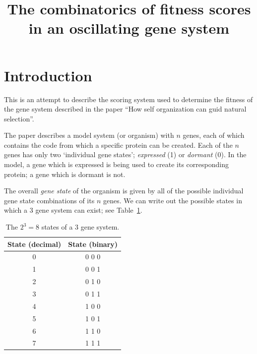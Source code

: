 \documentclass[11pt, a4paper]{article}
\title {
  The combinatorics of fitness scores in an oscillating gene system
}
\date{} %
\author{\Authors}
\begin{document}
\setlength{\droptitle}{-1.8cm} %
\maketitle

\vspace{-1.8cm} %

\section{Introduction}

This is an attempt to describe the scoring system used to determine
the fitness of the gene system described in the paper ``How self
organization can guid natural selection''.

The paper describes a model system (or organism) with $n$ genes, each
of which contains the code from which a specific protein can be
created. Each of the $n$ genes has only two `individual gene
states'; \emph{expressed} (1) or \emph{dormant} (0). In the model, a
gene which is expressed is being used to create its corresponding
protein; a gene which is dormant is not.

The overall \emph{gene state} of the organism is given by all of the
possible individual gene state combinations of its $n$ genes. We can
write out the possible states in which a 3 gene system can exist; see
Table~\ref{tab:states}.

\begin{table}[h!]
  \begin{center}
    \caption{The $2^3 = 8$ states of a 3 gene system.}
    \label{tab:states}
    \begin{tabular}{c|c}
      \textbf{State (decimal)} & \textbf{State (binary)} \\
      \hline
      0 & 0 0 0\\
      1 & 0 0 1\\
      2 & 0 1 0\\
      3 & 0 1 1\\
      4 & 1 0 0\\
      5 & 1 0 1\\
      6 & 1 1 0\\
      7 & 1 1 1\\
    \end{tabular}
  \end{center}
\end{table}
\end{document}
